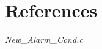 \documentclass[11pt]{article}
\begin{document}
\section{References}
\begingroup
\renewcommand{\section}[2]{}%
\nocite{*}


\endgroup

\section{Appendix}
	\subsection{\emph{New\_Alarm\_Cond.c}}
	\lstset{language=C}        
\end{document}
